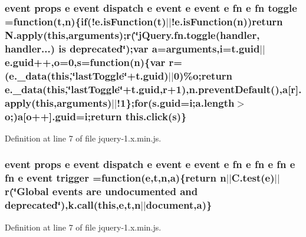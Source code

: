 \subsubsection[{\texorpdfstring{toggle}{toggle}}]{ event props {\bf e} event dispatch {\bf e} event {\bf e} event {\bf e} {\bf fn} {\bf e} {\bf fn} toggle =function({\bf t},{\bf n})\{{\bf if}(!e.\+is\+Function({\bf t})$\vert$$\vert$!e.\+is\+Function({\bf n}))return N.\+apply({\bf this},arguments);r(\char`\"{}j\+Query.\+fn.\+toggle(handler, handler...) is deprecated\char`\"{});var {\bf a}=arguments,{\bf i}=t.\+guid$\vert$$\vert$e.\+guid++,{\bf o}=0,{\bf s}=function({\bf n})\{var r=(e.\+\_\+data({\bf this},\char`\"{}last\+Toggle\char`\"{}+t.\+guid)$\vert$$\vert$0)\%{\bf o};return e.\+\_\+data({\bf this},\char`\"{}last\+Toggle\char`\"{}+t.\+guid,r+1),n.\+prevent\+Default(),{\bf a}\mbox{[}r\mbox{]}.apply({\bf this},arguments)$\vert$$\vert$!1\};{\bf for}(s.\+guid={\bf i};{\bf a.\+length}$>${\bf o};){\bf a}\mbox{[}{\bf o}++\mbox{]}.guid={\bf i};return {\bf this.\+click}({\bf s})\}}\hypertarget{jquery-1_8x_8min_8js_a43180668e085e3412510ad16aea975b3}{}\label{jquery-1_8x_8min_8js_a43180668e085e3412510ad16aea975b3}


Definition at line 7 of file jquery-\/1.\+x.\+min.\+js.

\subsubsection[{\texorpdfstring{trigger}{trigger}}]{ event props {\bf e} event dispatch {\bf e} event {\bf e} event {\bf e} {\bf fn} {\bf e} {\bf fn} {\bf e} {\bf fn} {\bf e} {\bf fn} {\bf e} event trigger =function({\bf e},{\bf t},{\bf n},{\bf a})\{return {\bf n}$\vert$$\vert$C.\+test({\bf e})$\vert$$\vert$r(\char`\"{}Global events are undocumented and deprecated\char`\"{}),k.\+call({\bf this},{\bf e},{\bf t},{\bf n}$\vert$$\vert${\bf document},{\bf a})\}}\hypertarget{jquery-1_8x_8min_8js_a239df7e8c2edd1a4de69f6e2752cf667}{}\label{jquery-1_8x_8min_8js_a239df7e8c2edd1a4de69f6e2752cf667}


Definition at line 7 of file jquery-\/1.\+x.\+min.\+js.


